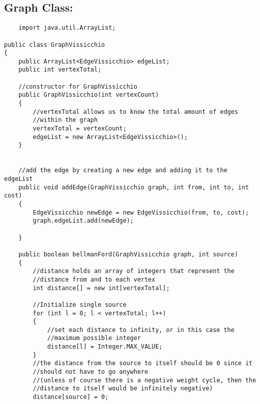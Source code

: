 \documentclass[letterpaper, 10pt]{article}
\begin{document}
\noindent
\subsection{Graph Class:}
\begin{lstlisting}
    import java.util.ArrayList;

public class GraphVissicchio 
{
    public ArrayList<EdgeVissicchio> edgeList;
    public int vertexTotal;

    //constructor for GraphVissicchio
    public GraphVissicchio(int vertexCount)
    {
        //vertexTotal allows us to know the total amount of edges 
        //within the graph
        vertexTotal = vertexCount;
        edgeList = new ArrayList<EdgeVissicchio>();
    }

    
    //add the edge by creating a new edge and adding it to the edgeList
    public void addEdge(GraphVissicchio graph, int from, int to, int cost)
    {
        EdgeVissicchio newEdge = new EdgeVissicchio(from, to, cost);
        graph.edgeList.add(newEdge);

    }

    public boolean bellmanFord(GraphVissicchio graph, int source)
    {
        //distance holds an array of integers that represent the
        //distance from and to each vertex
        int distance[] = new int[vertexTotal];
        
        //Initialize single source
        for (int l = 0; l < vertexTotal; l++)
        {
            //set each distance to infinity, or in this case the 
            //maximum possible integer
            distance[l] = Integer.MAX_VALUE;
        }
        //the distance from the source to itself should be 0 since it 
        //should not have to go anywhere
        //(unless of course there is a negative weight cycle, then the 
        //distance to itself would be infinitely negative)
        distance[source] = 0;


\end{lstlisting}
\end{document}
